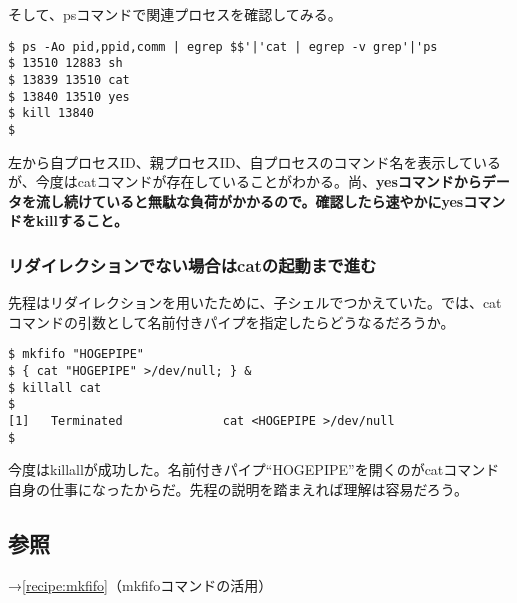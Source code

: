 そして、psコマンドで関連プロセスを確認してみる。

\begin{screen}
	\verb!$ ps -Ao pid,ppid,comm | egrep $$'|'cat | egrep -v grep'|'ps! \return \\
	\verb|$ 13510 12883 sh| \\
	\verb|$ 13839 13510 cat| \\
	\verb|$ 13840 13510 yes| \\
	\verb|$ kill 13840| \return \\
	\verb|$ |
\end{screen}

左から自プロセスID、親プロセスID、自プロセスのコマンド名を表示しているが、今度はcatコマンドが存在していることがわかる。尚、\textbf{yesコマンドからデータを流し続けていると無駄な負荷がかかるので。確認したら速やかにyesコマンドをkillすること。}

\subsubsection*{リダイレクションでない場合はcatの起動まで進む}

先程はリダイレクションを用いたために、子シェルでつかえていた。では、catコマンドの引数として名前付きパイプを指定したらどうなるだろうか。

\begin{screen}
	\verb|$ mkfifo "HOGEPIPE"| \return \\
	\verb|$ { cat "HOGEPIPE" >/dev/null; } &| \return \\
	\verb|$ killall cat| \return \\
	\verb|$ | \return \\
	\verb|[1]   Terminated              cat <HOGEPIPE >/dev/null| \\
	\verb|$ |
\end{screen}

今度はkillallが成功した。名前付きパイプ``HOGEPIPE''を開くのがcatコマンド自身の仕事になったからだ。先程の説明を踏まえれば理解は容易だろう。

\subsection*{参照}

\noindent
→\ref{recipe:mkfifo}（mkfifoコマンドの活用）
